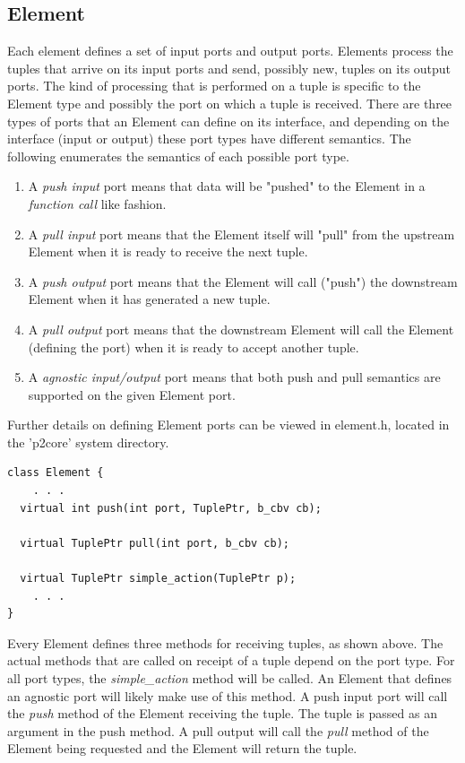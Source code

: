 \documentclass[12pt]{article}
\begin{document}
\subsection{Element}
Each element defines a set of input ports and output ports.
Elements process the tuples that arrive on its input ports and send, possibly
new, tuples on its output ports. The kind of processing that is performed on a tuple
is specific to the Element type and possibly the port on which a tuple is received. 
There are three types of ports that an Element can define on its interface, and 
depending on the interface (input or output) these port types have different semantics.
The following enumerates the semantics of each possible port type.
\begin{enumerate}
\item A \emph{push input} port means that data will be "pushed" to the Element in a
\emph{function call} like fashion. 
\item A \emph{pull input} port means that the Element itself will "pull" from the upstream Element when it is ready to receive the next tuple.
\item A \emph{push output} port means that the Element will call ("push") the
downstream Element when it has generated a new tuple.
\item A \emph{pull output} port means that the downstream Element will call the Element
(defining the port) when it is ready to accept another tuple. 
\item A \emph{agnostic input/output} port means that both push and pull semantics 
are supported on the given Element port.
\end{enumerate}
Further details on defining Element ports can be viewed in element.h, located in 
the 'p2core' system directory. 

\begin{verbatim}
class Element {
    . . .
  virtual int push(int port, TuplePtr, b_cbv cb);

  virtual TuplePtr pull(int port, b_cbv cb);

  virtual TuplePtr simple_action(TuplePtr p);
    . . .
}
\end{verbatim}

Every Element defines three methods for receiving tuples, as shown above.
The actual methods that are called on receipt of a tuple depend on the port 
type. For all port types, the \emph{simple\_action} method will be called. An
Element that defines an agnostic port will likely make use of this method.
A push input port will call the \emph{push} method of the Element receiving the
tuple. The tuple is passed as an argument in the push method. A pull output will 
call the \emph{pull} method of the Element being requested and the Element 
will return the tuple.
\end{document}
